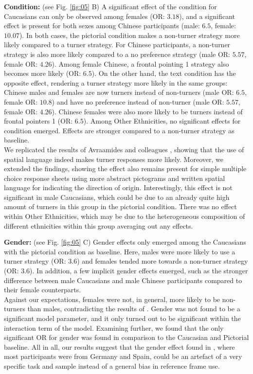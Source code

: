 \documentclass{frontiersSCNS} %
\begin{document}
\textbf{Condition:} (see Fig. \ref{fig:05} B)
A significant effect of the condition for Caucasians can only be observed among females (OR: $3.18$), and a significant effect is present for both sexes among Chinese participants (male: $6.5$, female: $10.07$). In both cases, the pictorial condition makes a non-turner strategy more likely compared to a turner strategy. For Chinese participants, a non-turner strategy is also more likely compared to a no preference strategy (male OR: $5.57$, female OR: $4.26$). Among female Chinese, a frontal pointing 1 strategy also becomes more likely (OR: $6.5$). 
On the other hand, the text condition has the opposite effect, rendering a turner strategy more likely in the same groups: Chinese males and females are now turners instead of non-turners (male OR: $6.5$, female OR: $10.8$) and have no preference instead of non-turner (male OR: $5.57$, female OR: $4.26$). Chinese females were also more likely to be turners instead of frontal pointers 1 (OR: $6.5$). Among Other Ethnicities, no significant effects for condition emerged. Effects are stronger compared to a non-turner strategy as baseline.\\
We replicated the results of Avraamides and colleagues \citep{Avraamides2004}, showing that the use of spatial language indeed makes turner responses more likely. Moreover, we extended the findings, showing the effect also remains present for simple multiple choice response sheets using more abstract pictograms and written spatial language for indicating the direction of origin. Interestingly, this effect is not significant in male Caucasians, which could be due to an already quite high amount of turners in this group in the pictorial condition. There was no effect within Other Ethnicities, which may be due to the heterogeneous composition of different ethnicities within this group averaging out any effects.

\textbf{Gender:} (see Fig. \ref{fig:05} C)
Gender effects only emerged among the Caucasians with the pictorial condition as baseline. Here, males were more likely to use a turner strategy (OR: $3.6$) and females tended more towards a non-turner strategy (OR: $3.6$).
In addition, a few implicit gender effects emerged, such as the stronger difference between male Caucasians and male Chinese participants compared to their female counterparts.\\
Against our expectations, females were not, in general, more likely to be non-turners than males, contradicting the results of \citep{Goeke2013}. Gender was not found to be a significant model parameter, and it only turned out to be significant within the interaction term of the model. Examining further, we found that the only significant OR for gender was found in comparison to the Caucasian and Pictorial baseline. All in all, our results suggest that the gender effect found in \cite{Goeke2013}, where most participants were from Germany and Spain, could be an artefact of a very specific task and sample instead of a general bias in reference frame use.
\end{document}
